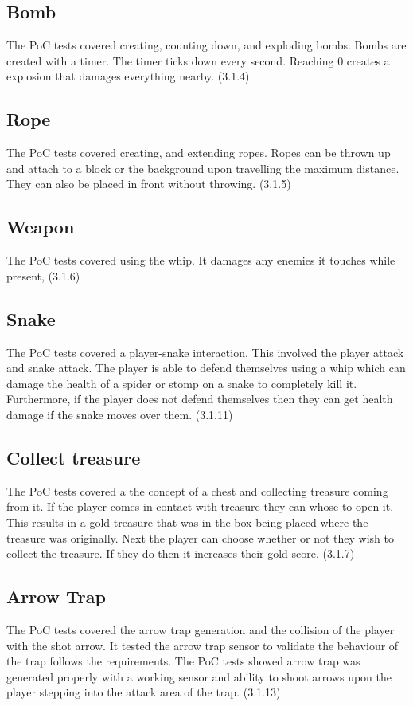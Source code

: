 \documentclass[12pt, titlepage]{article}
\begin{document}
\subsection{Bomb}
The PoC tests covered creating, counting down, and exploding bombs. Bombs are created with a timer. The timer ticks down every second. Reaching 0 creates a explosion that damages everything nearby. (3.1.4)

\subsection{Rope}
The PoC tests covered creating, and extending ropes. Ropes can be thrown up and attach to a block or the background upon travelling the maximum distance. They can also be placed in front without throwing. (3.1.5)

\subsection{Weapon}
The PoC tests covered using the whip. It damages any enemies it touches while present, (3.1.6)

\subsection{Snake}
The PoC tests covered a player-snake interaction. This involved the player attack and snake attack. The player is able to defend themselves using a whip which can damage the health of a spider or stomp on a snake to completely kill it. Furthermore, if the player does not defend themselves then they can get health damage if the snake moves over them. (3.1.11)

\subsection{Collect treasure}
The PoC tests covered a the concept of a chest and collecting treasure coming from it. If the player comes in contact with treasure they can whose to open it. This results in a gold treasure that was in the box being placed where the treasure was originally. Next the player can choose whether or not they wish to collect the treasure. If they do then it increases their gold score. (3.1.7)

\subsection{Arrow Trap}
The PoC tests covered the arrow trap generation and the collision of the player with the shot arrow. It tested the arrow trap sensor to validate the behaviour of the trap follows the requirements. The PoC tests showed arrow trap was generated properly with a working sensor and ability to shoot arrows upon the player stepping into the attack area of the trap. (3.1.13)
\end{document}
